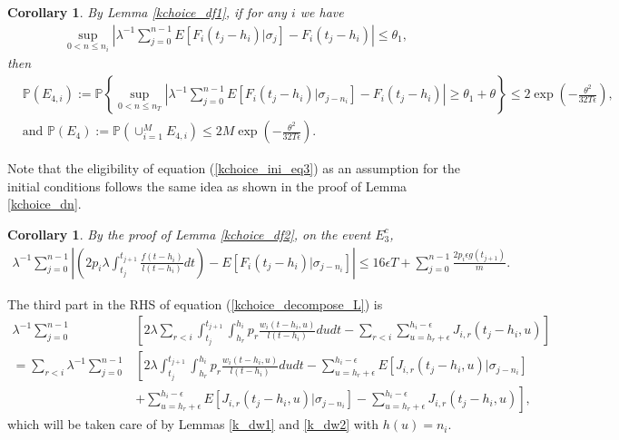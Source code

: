 \documentclass[12pt]{article}
\def\P{\mathbb{P}}
\numberwithin{equation}{section}  %
\newtheorem{cor}[thm]{Corollary}
\begin{document}
\begin{cor}\label{kchoice_df1_cor}
By Lemma \ref{kchoice_df1}, if for any $i$ we have
\begin{align}
\sup_{0< n\leq n_i}\left|\lambda^{-1}\sum_{j=0}^{n-1}  E[F_i(t_j-h_i)|\sigma_j]-F_i(t_j-h_i)\right|\leq \theta_1,\label{kchoice_ini_eq3}
\end{align} 
then
{\footnotesize
\begin{align*}
&\P(E_{4,i}):=\P\left\{\sup_{0< n\leq n_T}\left|\lambda^{-1}\sum_{j=0}^{n-1}  E[F_i(t_j-h_i)|\sigma_{j-n_i}]-F_i(t_j-h_i)\right|\geq \theta_1+\theta  \right\}\leq 2\exp\left(-\frac{\theta^2}{32 T\epsilon}\right),\\
&\text{and }\P(E_4):=\P(\cup_{i=1}^M E_{4,i})\leq 2M \exp\left(-\frac{\theta^2}{32T\epsilon}\right).
\end{align*}}
\end{cor}
Note that the eligibility of equation (\ref{kchoice_ini_eq3}) as an assumption for the initial conditions follows the same idea as shown in the proof of Lemma \ref{kchoice_dn}.

\begin{cor}\label{kchoice_df2_cor}
By the proof of Lemma \ref{kchoice_df2}, on the event $E_3^c$,
\begin{align*}
\lambda^{-1} \sum_{j=0}^{n-1}\left|\left(
2 p_i\lambda\int_{t_j}^{t_{j+1}}\frac{f(t-h_i)}{l(t-h_i)}dt
\right)-E[F_i(t_j-h_i)|\sigma_{j-n_i}]\right|\leq 16\epsilon T+\sum_{j=0}^{n-1} \frac{2p_i\epsilon g(t_{j+1})}{m}.
\end{align*}
\end{cor}

The third part in the RHS of equation (\ref{kchoice_decompose_L}) is
\begin{align*}
\lambda^{-1}\sum_{j=0}^{n-1}&\left[
2\lambda\sum_{r<i}\int_{t_j}^{t_{j+1}}\int_{h_r}^{h_i}p_r\frac{w_i(t-h_i,u)}{l(t-h_i)}dudt-
\sum_{r<i}\sum_{u=h_r+\epsilon}^{h_i-\epsilon}J_{i,r}(t_j-h_i,u)
\right]\\
=\sum_{r<i}\lambda^{-1}\sum_{j=0}^{n-1}&\left[
2\lambda\int_{t_j}^{t_{j+1}}\int_{h_r}^{h_i}p_r\frac{w_i(t-h_i,u)}{l(t-h_i)}dudt-\sum_{u=h_r+\epsilon}^{h_i-\epsilon}E[J_{i,r}(t_j-h_i,u)|\sigma_{j-n_i}]\right.\\
&\left.+\sum_{u=h_r+\epsilon}^{h_i-\epsilon}E[J_{i,r}(t_j-h_i,u)|\sigma_{j-n_i}]
-\sum_{u=h_r+\epsilon}^{h_i-\epsilon}J_{i,r}(t_j-h_i,u)
\right],
\end{align*}
which will be taken care of by Lemmas \ref{k_dw1} and \ref{k_dw2} with $h(u)=n_i$.
\end{document}
